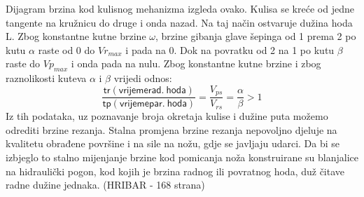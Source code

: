 \documentclass[a4paper,12pt]{article}
\numberwithin{figure}{section}
\begin{document}
Dijagram brzina kod kulisnog mehanizma izgleda ovako. Kulisa se kreće od jedne tangente na kružnicu do druge i onda nazad. Na taj način ostvaruje dužina hoda L. Zbog konstantne kutne brzine $\omega$, brzine gibanja glave šepinga od 1 prema 2 po kutu $\alpha$ raste od 0 do $Vr_{max}$ i pada na 0. Dok na povratku od 2 na 1 po kutu $\beta$ raste do $Vp_{max}$ i onda pada na nulu. Zbog konstantne kutne brzine i zbog raznolikosti kuteva $\alpha$ i $\beta$ vrijedi odnos:
\begin{equation}
\frac{\mathsf{tr(vrijeme rad.\:hoda)}}{\mathsf{tp(vrijeme par.\:hoda)}} = \frac{V_{ps}}{V_{rs}} = \frac{\alpha}{\beta}>1
\end{equation}
Iz tih podataka, uz poznavanje broja okretaja kulise i dužine puta možemo odrediti brzine rezanja. Stalna promjena brzine rezanja nepovoljno djeluje na kvalitetu obrađene površine i na sile na nožu, gdje se javljaju udarci. Da bi se izbjeglo to stalno mijenjanje brzine kod pomicanja noža konstruirane su blanjalice na hidraulički pogon, kod kojih je brzina radnog ili povratnog hoda, duž čitave radne dužine jednaka. (HRIBAR - 168 strana)
\end{document}
